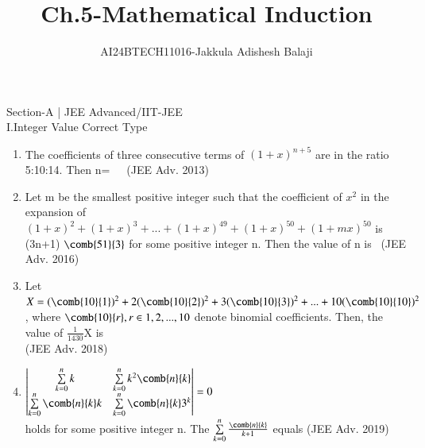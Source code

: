 \documentclass[journal,12pt,twocolumn]{IEEEtran}
\theoremstyle{remark}
\begin{document}

\vspace{3cm}

\title{Ch.5-Mathematical Induction}
\author{AI24BTECH11016-Jakkula Adishesh Balaji}

\maketitle
\newpage
\bigskip


\renewcommand{\thefigure}{\theenumi}
\renewcommand{\thetable}{\theenumi}
Section-A | JEE Advanced/IIT-JEE\\
 I.Integer Value Correct Type
\begin{enumerate}
        \item
            The coefficients of three consecutive terms of $(1+x)^{n+5}$ are in the ratio 5:10:14. Then n=\, \, \,
            \hfill  (JEE Adv. 2013)
        \item
            Let m be the smallest positive integer such that the coefficient of $x^{2}$ in the expansion of $(1+x)^{2} + (1+x)^{3} + ... + (1+x)^{49} + (1+x)^{50} + (1+mx)^{50}$ is (3n+1) $\comb{51}{3}$ for some positive integer n. Then the value of n is \,
            \hfill (JEE Adv. 2016)
        \item
            Let \\ $X= (\comb{10}{1})^{2}+2(\comb{10}{2})^{2} + 3(\comb{10}{3})^{2} + ... + 10(\comb{10}{10})^{2}$, where $\comb{10}{r} , r \in {1,2,...,10}$ denote binomial coefficients. Then, the value of $\frac{1}{1430}$X is \\ 
            \hfill (JEE Adv. 2018)
        \item
           $\begin{vmatrix} \sum\limits_{k=0}^{n}k & \sum\limits_{k=0}^{n} k^{2} \comb{n}{k} \\ \sum\limits_{k=0}^{n}\comb{n}{k} k & \sum\limits_{k=0}^{n}\comb{n}{k} 3^{k}\end{vmatrix}=0$ \\
holds for some positive integer n. The $\sum\limits_{k=0}^{n} \frac{\comb{n}{k}}{k+1}$ equals 
           \hfill (JEE Adv. 2019)
\end{enumerate}
\end{document}
